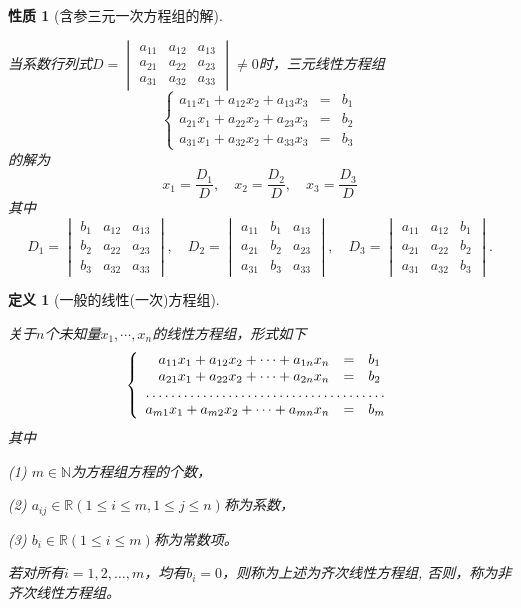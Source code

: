\documentclass[a4paper]{book}
\newtheorem{prop}{性质}[chapter]
\newtheorem{Def}{定义}[chapter]
\newcommand{\enum}{\begin{list}{}{\setlength{\leftmargin}{0pt} \setlength{\itemindent}{2.5em} \setlength{\listparindent}{2em}}}
\begin{document}
\begin{prop}[含参三元一次方程组的解]\

当系数行列式$D = \begin{vmatrix} a_{11} & a_{12} & a_{13} \\ a_{21} & a_{22} & a_{23} \\ a_{31} & a_{32} & a_{33} \end{vmatrix} \neq 0$时，三元线性方程组
$$\left\{ \begin{array}{rcl} a_{11}x_1 + a_{12}x_2 + a_{13}x_3 & = & b_1 \\ a_{21}x_1 + a_{22}x_2 + a_{23}x_3 & = & b_2 \\ a_{31}x_1 + a_{32}x_2 + a_{33}x_3 & = & b_3 \end{array}\right.$$
的解为
$$x_1 = \frac{D_1}{D}, \quad x_2 = \frac{D_2}{D}, \quad x_3 = \frac{D_3}{D}$$
其中
$$D_1 = \begin{vmatrix} b_1 & a_{12} & a_{13} \\ b_2 & a_{22} & a_{23} \\ b_3 & a_{32} & a_{33} \end{vmatrix}, \quad D_2 = \begin{vmatrix} a_{11} & b_1 & a_{13} \\ a_{21} & b_2 & a_{23}  \\ a_{31} & b_3 & a_{33} \end{vmatrix}, \quad D_3 = \begin{vmatrix} a_{11} & a_{12} & b_1 \\ a_{21} & a_{22} & b_2   \\ a_{31} & a_{32} & b_3 \end{vmatrix}.$$
\end{prop}

\begin{Def}[一般的线性(一次)方程组]\

关于$n$个未知量$x_1,\cdots,x_n$的线性方程组，形式如下
\begin{equation} \label{eq:2.1}
\left\{ \begin{array}{rcl} a_{11}x_1 + a_{12}x_2 + \cdots + a_{1n}x_n & = & b_1 \\ a_{21}x_1 + a_{22}x_2 + \cdots + a_{2n}x_n & = & b_2 \\ \hdotsfor{3} \\ a_{m1}x_1 + a_{m2}x_2 + \cdots + a_{mn}x_n & = & b_m \end{array}\right.
\end{equation}
其中
\enum
\item[(1)] $m \in \mathbb{N}$为方程组方程的个数，
\item[(2)] $a_{ij}\in\mathbb{R}(1\leqslant i \leqslant m, 1\leqslant j \leqslant n)$称为系数，
\item[(3)] $b_i\in\mathbb{R}(1\leqslant i \leqslant m)$称为常数项。
\end{list}

若对所有$i=1,2,…,m$，均有$b_i=0$，则称为上述为齐次线性方程组, 否则，称为非齐次线性方程组。
\end{Def}
\end{document}
